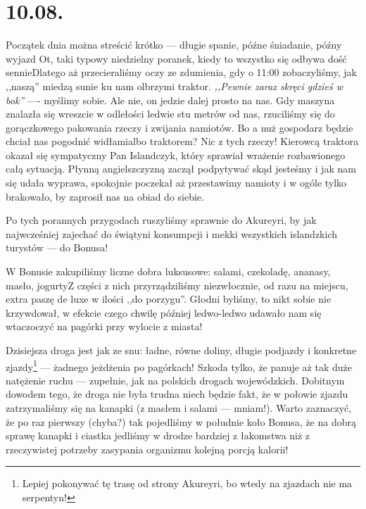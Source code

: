 \chapter*{10.08.}

Początek dnia można streścić krótko --- długie spanie, późne śniadanie, późny wyjazd \wink Ot, taki typowy niedzielny poranek, kiedy to wszystko się odbywa dość sennie\textellipsis Dlatego aż przecieraliśmy oczy ze zdumienia, gdy o 11:00 zobaczyliśmy, jak ,,naszą'' miedzą sunie ku nam olbrzymi traktor. \emph{,,Pewnie zaraz skręci gdzieś w bok''} ---- myślimy sobie. Ale nie, on jedzie dalej prosto na nas. Gdy maszyna znalazła się wreszcie w odlełości ledwie stu metrów od nas, rzuciliśmy się do gorączkowego pakowania rzeczy i zwijania namiotów. Bo a nuż gospodarz będzie chciał nas pogodnić widłami\textellipsis albo traktorem? Nic z tych rzeczy! Kierowcą traktora okazał się sympatyczny Pan Islandczyk, który sprawiał wrażenie rozbawionego całą sytuacją. Płynną angielszczyzną zaczął podpytywać skąd jesteśmy i jak nam się udała wyprawa, spokojnie poczekał aż przestawimy namioty i w ogóle tylko brakowało, by zaprosił nas na obiad do siebie.

Po tych porannych przygodach ruszyliśmy sprawnie do Akureyri, by jak najwcześniej zajechać do świątyni konsumpcji i mekki wszystkich islandzkich turystów --- do Bonusa!


W Bonusie zakupiliśmy liczne dobra luksusowe: salami, czekoladę, ananasy, masło, jogurty\textellipsis Z części z nich przyrządziliśmy niezwłocznie, od razu na miejscu, extra paszę de luxe w ilości ,,do porzygu''. Głodni byliśmy, to nikt sobie nie krzywdował, w efekcie czego chwilę później ledwo-ledwo udawało nam się wtaczoczyć na pagórki przy wylocie z miasta!


Dzisiejsza droga jest jak ze snu: ładne, równe doliny, długie podjazdy i konkretne zjazdy\footnote{Lepiej pokonywać tę trasę od strony Akureyri, bo wtedy na zjazdach nie ma serpentyn!} --- żadnego jeżdżenia po pagórkach! Szkoda tylko, że panuje aż tak duże natężenie ruchu --- zupełnie, jak na polskich drogach wojewódzkich. Dobitnym dowodem tego, że droga nie była trudna niech będzie fakt, że w połowie zjazdu zatrzymaliśmy się na kanapki (z masłem i salami --- mniam!). Warto zaznaczyć, że po raz pierwszy (chyba?) tak pojedliśmy w południe koło Bonusa, że na dobrą sprawę kanapki i ciastka jedliśmy w drodze bardziej z łakomstwa niż z rzeczywistej potrzeby zasypania organizmu kolejną porcją kalorii!


